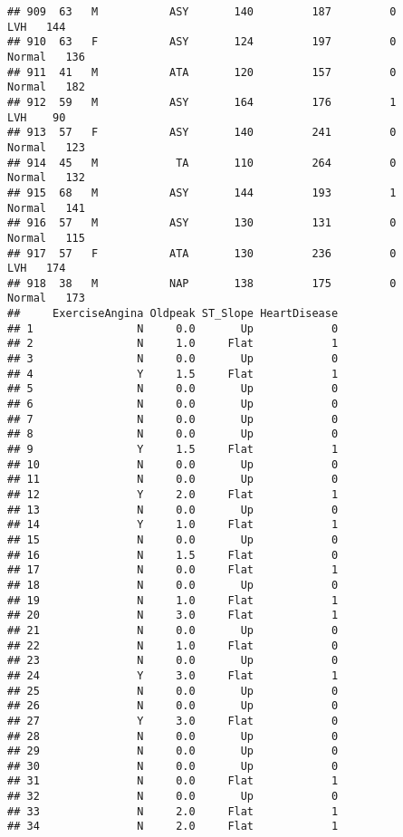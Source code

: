 \documentclass[
]{article}
\begin{document}
\begin{verbatim}
## 909  63   M           ASY       140         187         0        LVH   144
## 910  63   F           ASY       124         197         0     Normal   136
## 911  41   M           ATA       120         157         0     Normal   182
## 912  59   M           ASY       164         176         1        LVH    90
## 913  57   F           ASY       140         241         0     Normal   123
## 914  45   M            TA       110         264         0     Normal   132
## 915  68   M           ASY       144         193         1     Normal   141
## 916  57   M           ASY       130         131         0     Normal   115
## 917  57   F           ATA       130         236         0        LVH   174
## 918  38   M           NAP       138         175         0     Normal   173
##     ExerciseAngina Oldpeak ST_Slope HeartDisease
## 1                N     0.0       Up            0
## 2                N     1.0     Flat            1
## 3                N     0.0       Up            0
## 4                Y     1.5     Flat            1
## 5                N     0.0       Up            0
## 6                N     0.0       Up            0
## 7                N     0.0       Up            0
## 8                N     0.0       Up            0
## 9                Y     1.5     Flat            1
## 10               N     0.0       Up            0
## 11               N     0.0       Up            0
## 12               Y     2.0     Flat            1
## 13               N     0.0       Up            0
## 14               Y     1.0     Flat            1
## 15               N     0.0       Up            0
## 16               N     1.5     Flat            0
## 17               N     0.0     Flat            1
## 18               N     0.0       Up            0
## 19               N     1.0     Flat            1
## 20               N     3.0     Flat            1
## 21               N     0.0       Up            0
## 22               N     1.0     Flat            0
## 23               N     0.0       Up            0
## 24               Y     3.0     Flat            1
## 25               N     0.0       Up            0
## 26               N     0.0       Up            0
## 27               Y     3.0     Flat            0
## 28               N     0.0       Up            0
## 29               N     0.0       Up            0
## 30               N     0.0       Up            0
## 31               N     0.0     Flat            1
## 32               N     0.0       Up            0
## 33               N     2.0     Flat            1
## 34               N     2.0     Flat            1

\end{verbatim}
\end{document}
